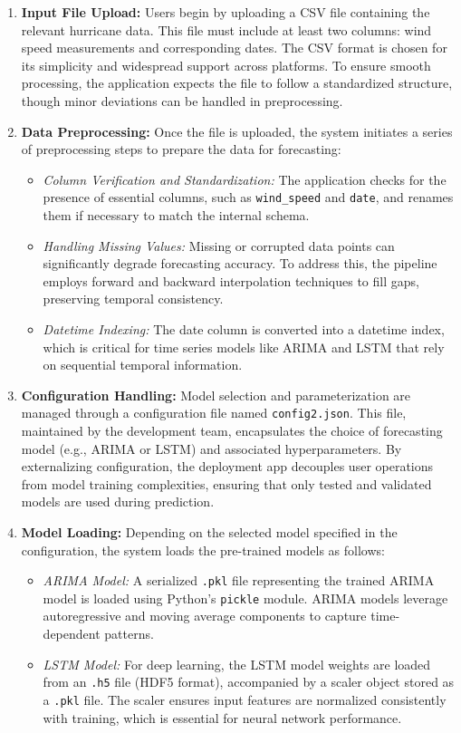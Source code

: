 \begin{enumerate}
	\item \textbf{Input File Upload:} 
	Users begin by uploading a CSV file containing the relevant hurricane data. This file must include at least two columns: wind speed measurements and corresponding dates. The CSV format is chosen for its simplicity and widespread support across platforms. To ensure smooth processing, the application expects the file to follow a standardized structure, though minor deviations can be handled in preprocessing.
	
	\item \textbf{Data Preprocessing:}
	Once the file is uploaded, the system initiates a series of preprocessing steps to prepare the data for forecasting:
	\begin{itemize}
		\item \emph{Column Verification and Standardization:} The application checks for the presence of essential columns, such as \texttt{wind\_speed} and \texttt{date}, and renames them if necessary to match the internal schema.
		\item \emph{Handling Missing Values:} Missing or corrupted data points can significantly degrade forecasting accuracy. To address this, the pipeline employs forward and backward interpolation techniques to fill gaps, preserving temporal consistency.
		\item \emph{Datetime Indexing:} The date column is converted into a datetime index, which is critical for time series models like ARIMA and LSTM that rely on sequential temporal information.
	\end{itemize}
	
	\item \textbf{Configuration Handling:}
	Model selection and parameterization are managed through a configuration file named \texttt{config2.json}. This file, maintained by the development team, encapsulates the choice of forecasting model (e.g., ARIMA or LSTM) and associated hyperparameters. By externalizing configuration, the deployment app decouples user operations from model training complexities, ensuring that only tested and validated models are used during prediction.
	
	\item \textbf{Model Loading:}
	Depending on the selected model specified in the configuration, the system loads the pre-trained models as follows:
	\begin{itemize}
		\item \emph{ARIMA Model:} A serialized \texttt{.pkl} file representing the trained ARIMA model is loaded using Python's \texttt{pickle} module. ARIMA models leverage autoregressive and moving average components to capture time-dependent patterns.
		\item \emph{LSTM Model:} For deep learning, the LSTM model weights are loaded from an \texttt{.h5} file (HDF5 format), accompanied by a scaler object stored as a \texttt{.pkl} file. The scaler ensures input features are normalized consistently with training, which is essential for neural network performance.
	\end{itemize}
	

\end{enumerate}
